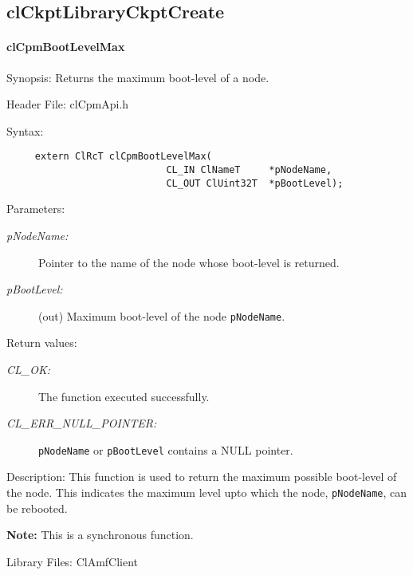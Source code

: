 {\newpage



\subsection{clCkptLibraryCkptCreate}
\hypertarget{pagecpm107}{}\paragraph{cl\-Cpm\-Boot\-Level\-Max}\label{pagecpm107}
\begin{Desc}
\item[Synopsis:]Returns the maximum boot-level of a node.\end{Desc}
\begin{Desc}
\item[Header File:]clCpmApi.h\end{Desc}
\begin{Desc}
\item[Syntax:]

\footnotesize\begin{verbatim}     extern ClRcT clCpmBootLevelMax(
                			CL_IN ClNameT     *pNodeName,
                			CL_OUT ClUint32T  *pBootLevel);
\end{verbatim}
\normalsize
\end{Desc}
\begin{Desc}
\item[Parameters:]
\begin{description}
\item[{\em p\-Node\-Name:}]Pointer to the name of the node whose boot-level is returned. 
\item[{\em p\-Boot\-Level:}](out) Maximum boot-level of the node {\tt{p\-Node\-Name}}.\end{description}
\end{Desc}
\begin{Desc}
\item[Return values:]
\begin{description}
\item[{\em CL\_\-OK:}]The function executed successfully. \item[{\em CL\_\-ERR\_\-NULL\_\-POINTER:}]{\tt{pNodeName}} or {\tt{pBootLevel}} contains a NULL 
pointer.\end{description}
\end{Desc}
\begin{Desc}
\item[Description:]This function is used to return the maximum possible boot-level of the node. This indicates the maximum level upto which the node, 
{\tt{p\-Node\-Name}}, can be rebooted.\end{Desc}
{\bf Note:} This is a synchronous function.
\begin{Desc}
\item[Library Files:]Cl\-Amf\-Client\end{Desc}

}
